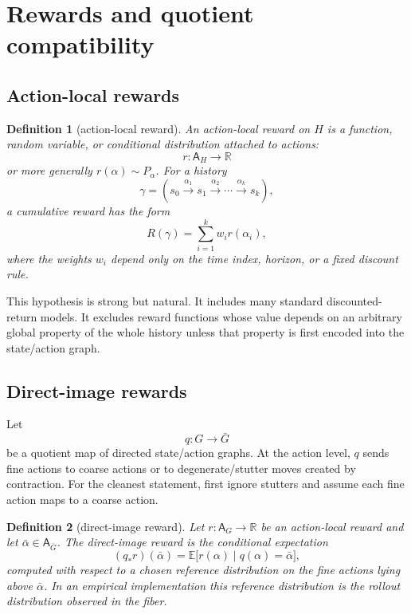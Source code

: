 \documentclass[11pt]{article}
\newtheorem{definition}{Definition}[section]
\newcommand{\Act}{\mathsf{A}}
\newcommand{\E}{\mathbb{E}}
\newcommand{\R}{\mathbb{R}}
\begin{document}
\section{Rewards and quotient compatibility}

\subsection{Action-local rewards}

\begin{definition}[action-local reward]
An action-local reward on \(H\) is a function, random variable, or conditional distribution attached to actions:
\[
    r:\Act_H\to \R
\]
or more generally \(r(\alpha)\sim P_{\alpha}\).  For a history
\[
    \gamma=(s_0\xrightarrow{\alpha_1}s_1\xrightarrow{\alpha_2}\cdots\xrightarrow{\alpha_k}s_k),
\]
a cumulative reward has the form
\[
    R(\gamma)=\sum_{i=1}^{k} w_i r(\alpha_i),
\]
where the weights \(w_i\) depend only on the time index, horizon, or a fixed discount rule.
\end{definition}

This hypothesis is strong but natural.  It includes many standard discounted-return models.  It excludes reward functions whose value depends on an arbitrary global property of the whole history unless that property is first encoded into the state/action graph.

\subsection{Direct-image rewards}

Let
\[
    q:G\to \bar G
\]
be a quotient map of directed state/action graphs.  At the action level, \(q\) sends fine actions to coarse actions or to degenerate/stutter moves created by contraction.  For the cleanest statement, first ignore stutters and assume each fine action maps to a coarse action.

\begin{definition}[direct-image reward]
Let \(r:\Act_G\to \R\) be an action-local reward and let \(\bar\alpha\in\Act_{\bar G}\).  The direct-image reward is the conditional expectation
\[
    (q_*r)(\bar\alpha)=\E\bigl[r(\alpha)\mid q(\alpha)=\bar\alpha\bigr],
\]
computed with respect to a chosen reference distribution on the fine actions lying above \(\bar\alpha\).  In an empirical implementation this reference distribution is the rollout distribution observed in the fiber.
\end{definition}
\end{document}
